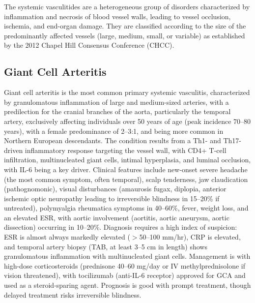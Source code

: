 

\label{sec:Vasculitis (Systemic Vasculitides)}

The systemic vasculitides are a heterogeneous group of disorders characterized by inflammation and necrosis of blood vessel walls, leading to vessel occlusion, ischemia, and end-organ damage. They are classified according to the size of the predominantly affected vessels (large, medium, small, or variable) as established by the 2012 Chapel Hill Consensus Conference (CHCC).

\subsection{Giant Cell Arteritis}
\label{sec:Giant Cell Arteritis}
Giant cell arteritis is the most common primary systemic vasculitis, characterized by granulomatous inflammation of large and medium-sized arteries, with a predilection for the cranial branches of the aorta, particularly the temporal artery, exclusively affecting individuals over 50 years of age (peak incidence 70--80 years), with a female predominance of 2--3:1, and being more common in Northern European descendants. The condition results from a Th1- and Th17-driven inflammatory response targeting the vessel wall, with CD4+ T-cell infiltration, multinucleated giant cells, intimal hyperplasia, and luminal occlusion, with IL-6 being a key driver. Clinical features include new-onset severe headache (the most common symptom, often temporal), scalp tenderness, jaw claudication (pathognomonic), visual disturbances (amaurosis fugax, diplopia, anterior ischemic optic neuropathy leading to irreversible blindness in 15--20\% if untreated), polymyalgia rheumatica symptoms in 40--60\%, fever, weight loss, and an elevated ESR, with aortic involvement (aortitis, aortic aneurysm, aortic dissection) occurring in 10--20\%. Diagnosis requires a high index of suspicion: ESR is almost always markedly elevated ($>$50--100 mm/hr), CRP is elevated, and temporal artery biopsy (TAB, at least 3--5 cm in length) shows granulomatous inflammation with multinucleated giant cells. Management is with high-dose corticosteroids (prednisone 40--60 mg/day or IV methylprednisolone if vision threatened), with tocilizumab (anti-IL-6 receptor) approved for GCA and used as a steroid-sparing agent. Prognosis is good with prompt treatment, though delayed treatment risks irreversible blindness.

